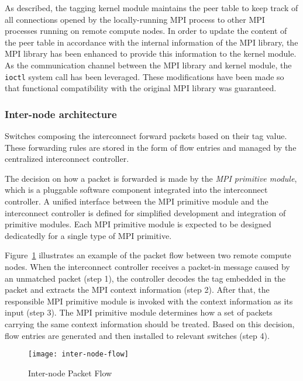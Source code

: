As described, the tagging kernel module maintains the peer table to keep
track of all connections opened by the locally-running MPI process to
other MPI processes running on remote compute nodes. In order to
update the content of the peer table in accordance with the internal
information of the MPI library, the MPI library has been enhanced to
provide this information to the kernel module. As the communication
channel between the MPI library and kernel module, the
\lstinline!ioctl! system call has been leveraged. These
modifications have been made so that functional compatibility with the
original MPI library was guaranteed.

\subsubsection{Inter-node architecture}

Switches composing the interconnect forward packets based on their tag
value. These forwarding rules are stored in the form of flow entries and
managed by the centralized interconnect controller.

The decision on how a packet is forwarded is made by the \emph{MPI
primitive module}, which is a pluggable software component integrated
into the interconnect controller. A unified interface between the MPI
primitive module and the interconnect controller is defined for
simplified development and integration of primitive modules. Each MPI
primitive module is expected to be designed dedicatedly for a single
type of MPI primitive.

Figure~\ref{fig:inter-node-flow} illustrates an example of the packet
flow between two remote compute nodes. When the interconnect
controller receives a packet-in message caused by an unmatched packet
(step 1), the controller decodes the tag embedded in the packet and extracts
the MPI context information (step 2). After that, the responsible MPI
primitive module is invoked with the context information as its input (step
3). The MPI primitive module determines how a set of packets carrying the same
context information should be treated. Based on this decision, flow entries
are generated and then installed to relevant switches (step 4).

\begin{figure}
    \centering
    \texttt{[image: inter-node-flow]}
    \caption{Inter-node Packet Flow}%
    \label{fig:inter-node-flow}
\end{figure}

